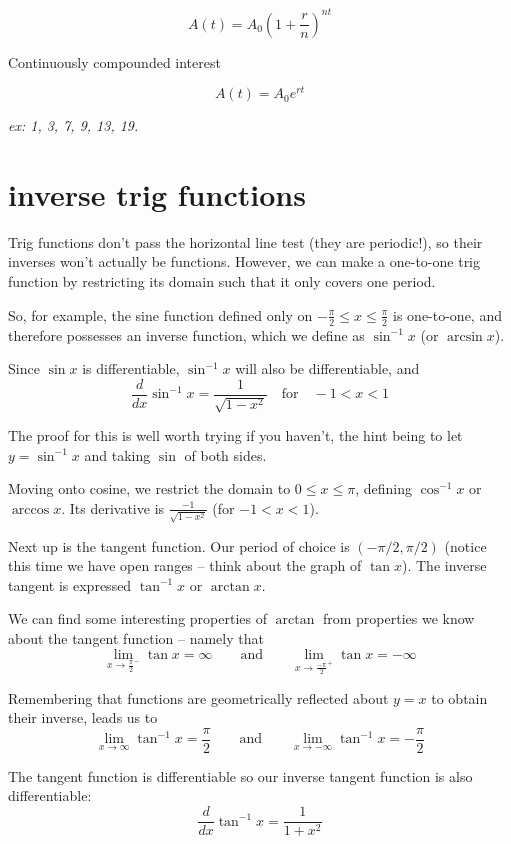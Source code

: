 \documentclass[10pt,a4paper]{report}
\begin{document}
$$
	A(t) = A_0 (1 + \frac{r}{n})^{nt}
$$

Continuously compounded interest

$$
	A(t) = A_0 e^{rt}
$$

\emph{ex: 1, 3, 7, 9, 13, 19.}


\section{inverse trig functions}

Trig functions don't pass the horizontal line test (they are periodic!), so their inverses won't actually be functions. However, we can make a one-to-one trig function by restricting its domain such that it only covers one period.

So, for example, the sine function defined only on $-\frac{\pi}{2} \leq x \leq \frac{\pi}{2}$ is one-to-one, and therefore possesses an inverse function, which we define as $\sin^{-1} x$ (or $\arcsin x$).

Since $\sin x$ is differentiable, $\sin^{-1} x$ will also be differentiable, and 
$$
	\frac{d}{dx} \sin^{-1} x = \frac{1}{\sqrt{1 - x^2}} \quad \text{for} \quad -1 < x < 1
$$

The proof for this is well worth trying if you haven't, the hint being to let $y = \sin^{-1} x$ and taking $\sin$ of both sides.

Moving onto cosine, we restrict the domain to $0 \leq x \leq \pi$, defining $\cos^{-1} x$ or $\arccos x$. Its derivative is $\frac{-1}{\sqrt{1 - x^2}}$ (for $-1 < x < 1$).

Next up is the tangent function. Our period of choice is $(-\pi / 2, \pi / 2)$ (notice this time we have open ranges -- think about the graph of $\tan x$). The inverse tangent is expressed $\tan^{-1} x$ or $\arctan x$.

We can find some interesting properties of $\arctan$ from properties we know about the tangent function -- namely that
$$
	\lim_{x \to \frac{\pi}{2}^-} \tan x = \infty \qquad \text{and} \qquad \lim_{x \to \frac{-\pi}{2}^+} \tan x = -\infty
$$

Remembering that functions are geometrically reflected about $y = x$ to obtain their inverse, leads us to
$$
	\lim_{x \to \infty} \tan^{-1} x = \frac{\pi}{2} \qquad \text{and} \qquad \lim_{x \to -\infty} \tan^{-1} x = -\frac{\pi}{2}
$$

The tangent function is differentiable so our inverse tangent function is also differentiable:
$$
	\frac{d}{dx} \tan^{-1} x = \frac{1}{1 + x^2}
$$
\end{document}
